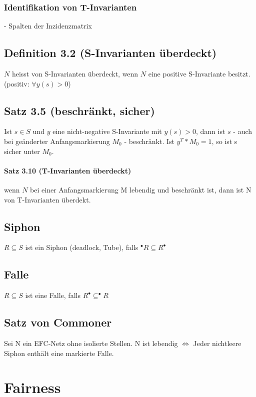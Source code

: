\documentclass[12pt]{scrreprt}
\begin{document}
\subsection*{Identifikation von T-Invarianten}
- Spalten der Inzidenzmatrix

\section*{Definition 3.2 (S-Invarianten überdeckt)}
$N$ heisst von S-Invarianten überdeckt, wenn $N$ eine positive S-Invariante besitzt. (positiv: $\forall y(s) > 0$)

\section*{Satz 3.5 (beschränkt, sicher)}
Ist $s \in S$ und $y$ eine nicht-negative S-Invariante mit $y(s) > 0$, dann ist $s$ - auch bei geänderter Anfangsmarkierung $M_{0}$ - beschränkt. Ist $y^{T} * M_{0} = 1$, so ist s sicher unter $M_{0}$.

\subsubsection*{Satz 3.10 (T-Invarianten überdeckt)}
wenn $N$ bei einer Anfangsmarkierung M lebendig und beschränkt ist, dann ist N von T-Invarianten überdekt.

\section*{Siphon}
$R \subseteq S$ ist ein Siphon (deadlock, Tube), falls $^\bullet R \subseteq R^\bullet$

\section*{Falle}
$R \subseteq S$ ist eine Falle, falls $R^\bullet \subseteq ^\bullet R$

\section*{Satz von Commoner}
Sei N ein EFC-Netz ohne isolierte Stellen.\newline
N ist lebendig $\Leftrightarrow$ Jeder nichtleere Siphon enthält eine markierte Falle.

\chapter{Fairness}
\end{document}

